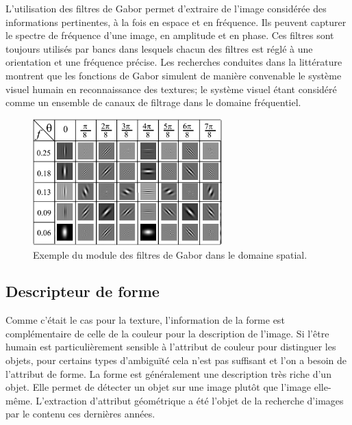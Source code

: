 L'utilisation des filtres de Gabor permet d'extraire de l'image considérée des informations pertinentes, à la fois en espace et en fréquence. Ils peuvent capturer le spectre de fréquence d'une image, en amplitude et en phase. Ces filtres sont toujours utilisés par bancs dans lesquels chacun des filtres est réglé à une orientation et une fréquence précise. Les recherches conduites dans la littérature montrent que les fonctions de Gabor simulent de manière convenable le système visuel humain en reconnaissance des textures; le système visuel étant considéré comme un ensemble de canaux de filtrage dans le domaine fréquentiel.
 \begin{figure}[H]
 	\label{fig:gabor49}
 	\centering
 	\includegraphics[width=0.65\textwidth]{Figures/gabor49} %
 	
 	\caption{Exemple du module des filtres de Gabor dans le domaine spatial.}
 	
 \end{figure}
 
 
%
%

\subsection{Descripteur de forme}
Comme c'était le cas pour la texture, l'information de la forme est complémentaire de celle de la couleur pour la description de l'image.  Si l'être humain est particulièrement sensible à l'attribut de couleur pour distinguer les objets, pour certains types d'ambiguïté cela n'est pas suffisant et l'on a besoin de l'attribut de forme. La forme est généralement une description très riche d’un objet. Elle permet de détecter un objet sur une image plutôt que l’image elle-même. L’extraction d’attribut géométrique a été l’objet de la recherche d’images par le contenu ces dernières années.\\

